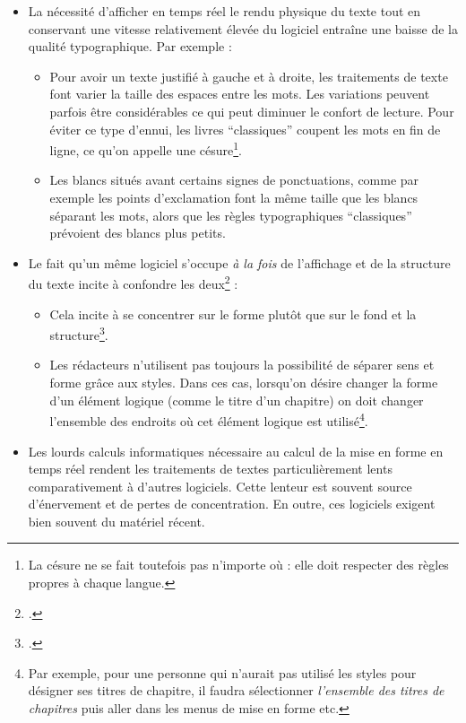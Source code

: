 \begin{itemize}
\item La nécessité d'afficher en temps réel le rendu physique du texte tout en conservant une vitesse relativement élevée du logiciel entraîne une baisse de la qualité typographique. Par exemple :
	\begin{itemize}
		\item Pour avoir un texte justifié à gauche et à droite, les traitements de texte font varier la taille des espaces entre les mots. Les variations peuvent parfois être considérables ce qui peut diminuer le confort de lecture. Pour éviter ce type d'ennui, les livres \enquote{classiques} coupent les mots en fin de ligne, ce qu'on appelle une césure\footnote{La césure ne se fait toutefois pas n'importe où : elle doit respecter des règles propres à chaque langue.}.
		\item Les blancs situés avant certains signes de ponctuations, comme par exemple les points d'exclamation font la même taille que les blancs séparant les mots, alors que les règles typographiques \enquote{classiques} prévoient des blancs plus petits.
	\end{itemize}
\item Le fait qu'un même logiciel s'occupe \emph{à la fois} de l'affichage et de la structure du texte incite à confondre les deux\footcite[Les auteurs de ces lignes sont moins sévères envers les traitements de texte que d'autres LaTeXiens : \cf][]{stupide}  :
	\begin{itemize}
		\item Cela incite à se concentrer sur le forme plutôt que sur le fond et la structure\footcite[Toutefois en théorie la formation universitaire de sciences humaines incite à penser \emph{structure et sens d'abord}.Voir un débat sur le blog d'un des auteurs][]{structurevsforme}. 
		\item Les rédacteurs n'utilisent pas toujours la possibilité de séparer sens et forme grâce aux styles. Dans ces cas, lorsqu'on désire changer la forme d'un élément logique (comme  le titre d'un chapitre) on doit changer l'ensemble des endroits où cet élément logique est utilisé\footnote{Par exemple, pour une personne  qui n'aurait pas utilisé les styles pour désigner ses titres de chapitre, il faudra sélectionner \emph{l'ensemble des titres de chapitres} puis aller dans les menus de mise en forme etc.}.
	\end{itemize}

\item Les lourds calculs informatiques nécessaire au calcul de la mise en forme en temps réel rendent les traitements de textes particulièrement lents comparativement à d'autres logiciels. Cette lenteur est souvent source d'énervement et de pertes de concentration. En outre, ces logiciels exigent bien souvent du matériel récent.
\end{itemize}


